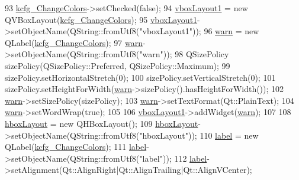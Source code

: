 \begin{DoxyCode}
93         \hyperlink{classUi__DlgAccessibilityBase_ad69ec5ae9e5bad5756a57dac036500eb}{kcfg\_ChangeColors}->setChecked(\textcolor{keyword}{false});
94         \hyperlink{classUi__DlgAccessibilityBase_a83ac60339f9462b3a0571677794fae95}{vboxLayout1} = \textcolor{keyword}{new} QVBoxLayout(\hyperlink{classUi__DlgAccessibilityBase_ad69ec5ae9e5bad5756a57dac036500eb}{kcfg\_ChangeColors});
95         \hyperlink{classUi__DlgAccessibilityBase_a83ac60339f9462b3a0571677794fae95}{vboxLayout1}->setObjectName(QString::fromUtf8(\textcolor{stringliteral}{"vboxLayout1"}));
96         \hyperlink{classUi__DlgAccessibilityBase_ad66df65b95e80cd067b2e387ca0052b2}{warn} = \textcolor{keyword}{new} QLabel(\hyperlink{classUi__DlgAccessibilityBase_ad69ec5ae9e5bad5756a57dac036500eb}{kcfg\_ChangeColors});
97         \hyperlink{classUi__DlgAccessibilityBase_ad66df65b95e80cd067b2e387ca0052b2}{warn}->setObjectName(QString::fromUtf8(\textcolor{stringliteral}{"warn"}));
98         QSizePolicy sizePolicy(QSizePolicy::Preferred, QSizePolicy::Maximum);
99         sizePolicy.setHorizontalStretch(0);
100         sizePolicy.setVerticalStretch(0);
101         sizePolicy.setHeightForWidth(\hyperlink{classUi__DlgAccessibilityBase_ad66df65b95e80cd067b2e387ca0052b2}{warn}->sizePolicy().hasHeightForWidth());
102         \hyperlink{classUi__DlgAccessibilityBase_ad66df65b95e80cd067b2e387ca0052b2}{warn}->setSizePolicy(sizePolicy);
103         \hyperlink{classUi__DlgAccessibilityBase_ad66df65b95e80cd067b2e387ca0052b2}{warn}->setTextFormat(Qt::PlainText);
104         \hyperlink{classUi__DlgAccessibilityBase_ad66df65b95e80cd067b2e387ca0052b2}{warn}->setWordWrap(\textcolor{keyword}{true});
105 
106         \hyperlink{classUi__DlgAccessibilityBase_a83ac60339f9462b3a0571677794fae95}{vboxLayout1}->addWidget(\hyperlink{classUi__DlgAccessibilityBase_ad66df65b95e80cd067b2e387ca0052b2}{warn});
107 
108         \hyperlink{classUi__DlgAccessibilityBase_aeeb2f92b0e4ffd3005446d6624d5cafe}{hboxLayout} = \textcolor{keyword}{new} QHBoxLayout();
109         \hyperlink{classUi__DlgAccessibilityBase_aeeb2f92b0e4ffd3005446d6624d5cafe}{hboxLayout}->setObjectName(QString::fromUtf8(\textcolor{stringliteral}{"hboxLayout"}));
110         \hyperlink{classUi__DlgAccessibilityBase_af08bc2aa14cf40f1a58ce05b6d98fef6}{label} = \textcolor{keyword}{new} QLabel(\hyperlink{classUi__DlgAccessibilityBase_ad69ec5ae9e5bad5756a57dac036500eb}{kcfg\_ChangeColors});
111         \hyperlink{classUi__DlgAccessibilityBase_af08bc2aa14cf40f1a58ce05b6d98fef6}{label}->setObjectName(QString::fromUtf8(\textcolor{stringliteral}{"label"}));
112         \hyperlink{classUi__DlgAccessibilityBase_af08bc2aa14cf40f1a58ce05b6d98fef6}{label}->setAlignment(Qt::AlignRight|Qt::AlignTrailing|Qt::AlignVCenter);

\end{DoxyCode}
